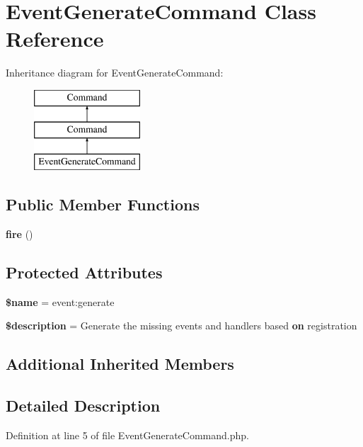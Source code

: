 \section{Event\+Generate\+Command Class Reference}
\label{class_illuminate_1_1_foundation_1_1_console_1_1_event_generate_command}
Inheritance diagram for Event\+Generate\+Command\+:\begin{figure}[H]
\begin{center}
\leavevmode
\includegraphics[height=3.000000cm]{class_illuminate_1_1_foundation_1_1_console_1_1_event_generate_command}
\end{center}
\end{figure}
\subsection*{Public Member Functions}
\begin{DoxyCompactItemize}
\item 
{\bf fire} ()
\end{DoxyCompactItemize}
\subsection*{Protected Attributes}
\begin{DoxyCompactItemize}
\item 
{\bf \$name} = \textquotesingle{}event\+:generate\textquotesingle{}
\item 
{\bf \$description} = \textquotesingle{}Generate the missing events and handlers based {\bf on} registration\textquotesingle{}
\end{DoxyCompactItemize}
\subsection*{Additional Inherited Members}


\subsection{Detailed Description}


Definition at line 5 of file Event\+Generate\+Command.\+php.



